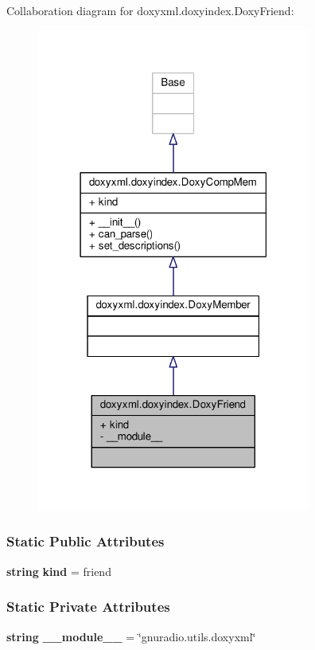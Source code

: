 Collaboration diagram for doxyxml.\+doxyindex.\+Doxy\+Friend\+:
\nopagebreak
\begin{figure}[H]
\begin{center}
\leavevmode
\includegraphics[width=255pt]{d7/d96/classdoxyxml_1_1doxyindex_1_1DoxyFriend__coll__graph}
\end{center}
\end{figure}
\subsubsection*{Static Public Attributes}
\begin{DoxyCompactItemize}
\item 
{\bf string} {\bf kind} = \textquotesingle{}friend\textquotesingle{}
\end{DoxyCompactItemize}
\subsubsection*{Static Private Attributes}
\begin{DoxyCompactItemize}
\item 
{\bf string} {\bf \+\_\+\+\_\+module\+\_\+\+\_\+} = \char`\"{}gnuradio.\+utils.\+doxyxml\char`\"{}
\end{DoxyCompactItemize}
